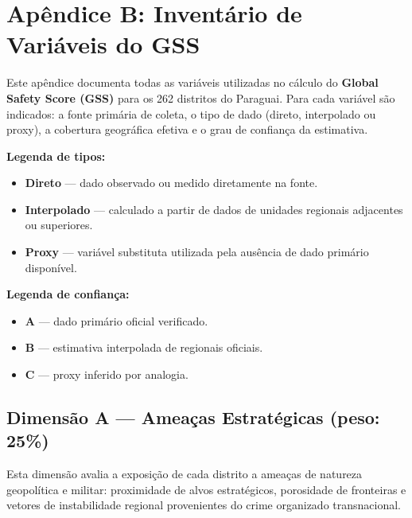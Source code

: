 
\chapter*{Apêndice B: Inventário de Variáveis do GSS}
\label{apendice:variaveis}

Este apêndice documenta todas as variáveis utilizadas no cálculo do
\textbf{Global Safety Score (GSS)} para os 262 distritos do Paraguai.
Para cada variável são indicados: a fonte primária de coleta, o tipo de
dado (direto, interpolado ou proxy), a cobertura geográfica efetiva e o
grau de confiança da estimativa.

\medskip
\noindent\textbf{Legenda de tipos:}
\begin{itemize}[nosep, leftmargin=1.5em]
  \item \textbf{Direto} — dado observado ou medido diretamente na fonte.
  \item \textbf{Interpolado} — calculado a partir de dados de unidades regionais
        adjacentes ou superiores.
  \item \textbf{Proxy} — variável substituta utilizada pela ausência de dado
        primário disponível.
\end{itemize}

\medskip
\noindent\textbf{Legenda de confiança:}
\begin{itemize}[nosep, leftmargin=1.5em]
  \item \textbf{A} — dado primário oficial verificado.
  \item \textbf{B} — estimativa interpolada de regionais oficiais.
  \item \textbf{C} — proxy inferido por analogia.
\end{itemize}

\section*{Dimensão A — Ameaças Estratégicas (peso: 25\%)}
\label{apendice:variaveis:dimA}

Esta dimensão avalia a exposição de cada distrito a ameaças de natureza
geopolítica e militar: proximidade de alvos estratégicos, porosidade de
fronteiras e vetores de instabilidade regional provenientes do crime
organizado transnacional.

